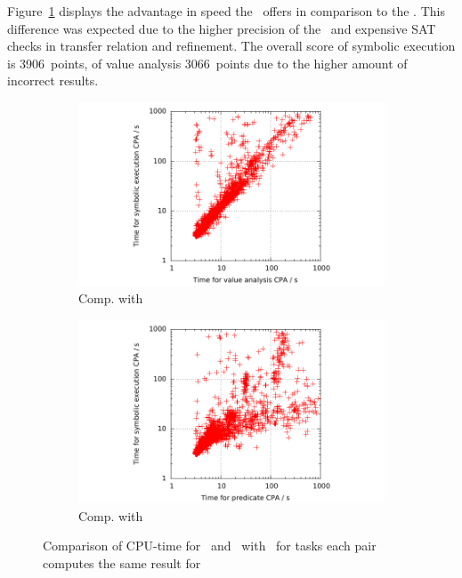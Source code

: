 Figure~\ref{fig:valCputime} displays the advantage in speed the \ offers in comparison to the \symbolicExecutionCPA.
This difference was expected due to the higher precision of the \symbolicExecutionCPA\ and expensive SAT checks in transfer relation and refinement.
The overall score of symbolic execution is 3906~points, of value analysis 3066~points due to the higher amount of incorrect results.

\begin{figure}
\centering
\begin{subfigure}[b]{.48\textwidth}
\includegraphics[trim=2cm 0 1cm 0, clip=true, scale=0.9]{evaluation/sp_cputime_VA_symEx}
\caption{Comp. with }
\label{fig:valCputime}
\end{subfigure}
\begin{subfigure}[b]{.48\textwidth}
\includegraphics[trim=2cm 0 1cm 0, clip=true, scale=0.9]{evaluation/sp_cputime_pred_symEx}
\caption{Comp. with \predicateCPA}
\label{fig:predCputime}
\end{subfigure}
\caption{Comparison of CPU-time for \ and \predicateCPA\ with \symbolicExecutionCPA\ for tasks each pair computes the same result for}
\end{figure}

